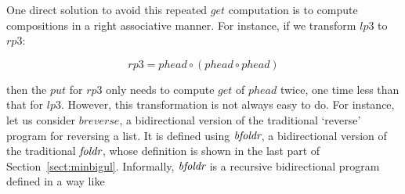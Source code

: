 



One direct solution to avoid this repeated $get$ computation is to compute compositions in a right associative manner. For instance, if we transform $lp3$ to $rp3$:\break

\minusvspacetwo
\vspace{-3mm}
\[
rp3 = phead \circ (phead \circ phead)
\]
\minusvspacetwo
\vspace{-0mm}

\noindent then the $put$ for $rp3$ only needs to compute $get$ of $phead$ twice, one time less than that for $lp3$.
However, this transformation is not always easy to do. For instance, let us consider $breverse$, a bidirectional version of the traditional `reverse' program for reversing a list. It is defined using $\mbox{\it bfoldr}$, a bidirectional version of the traditional $\mbox{\it foldr}$, whose definition  is shown in the last part of Section~\ref{sect:minbigul}. Informally, $\mbox{\it bfoldr}$ is a recursive bidirectional program defined in a way like

